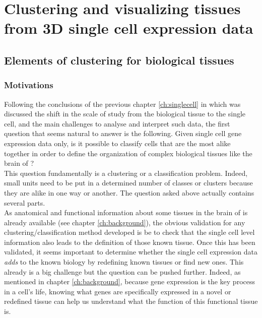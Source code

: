 \chapter{Clustering and visualizing tissues from 3D single cell expression data}\label{ch:non_spatial_clustering_visualization} 
\section{Elements of clustering for biological tissues}
	\subsection{Motivations}
	Following the conclusions of the previous chapter \ref{ch:singlecell} in which was discussed the shift in the scale of study from the biological tissue to the single cell, and the main challenges to analyse and interpret such data, the first question that seems natural to answer is the following. Given single cell gene expression data only, is it possible to classify cells that are the most alike together in order to define the organization of complex biological tissues like the brain of \platyfull{}?\\
	
	This question fundamentally is a clustering or a classification problem. Indeed, small units need to be put in a determined number of classes or clusters because they are alike in one way or another. The question asked above actually contains several parts.\\
	
	 As anatomical and functional information about some tissues in the brain of \platy{} is already available (see chapter \ref{ch:background}), the obvious validation for any clustering/classification method developed is be to check that the single cell level information also leads to the definition of those known tissue. Once this has been validated, it seems important to determine whether the single cell expression data \emph{adds} to the known biology by redefining known tissues or find new ones. This already is a big challenge but the question can be pushed further. Indeed, as mentioned in chapter \ref{ch:background}, because gene expression is the key process in a cell's life, knowing what genes are specifically expressed in a novel or redefined tissue can help us understand what the function of this functional tissue is.

